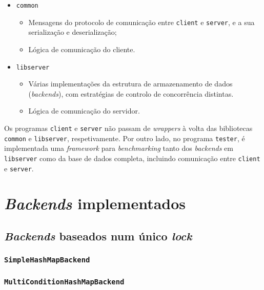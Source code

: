 \documentclass[12pt, a4paper, titlepage]{article}
\begin{document}
\begin{itemize}
    \item \texttt{common}
    \begin{itemize}
        \item Mensagens do protocolo de comunicação entre \texttt{client} e \texttt{server}, e a sua
            serialização e deserialização;

        \item Lógica de comunicação do cliente.
    \end{itemize}

    \item \texttt{libserver}
    \begin{itemize}
        \item Várias implementações da estrutura de armazenamento de dados (\emph{backends}), com
            estratégias de controlo de concorrência distintas.

        \item Lógica de comunicação do servidor.
    \end{itemize}
\end{itemize}

Os programas \texttt{client} e \texttt{server} não passam de \emph{wrappers} à volta das bibliotecas
\texttt{common} e \texttt{libserver}, respetivamente. Por outro lado, no programa \texttt{tester}, é
implementada uma \emph{framework} para \emph{benchmarking} tanto dos \emph{backends} em
\texttt{libserver} como da base de dados completa, incluindo comunicação entre \texttt{client} e
\texttt{server}.

\section{\emph{Backends} implementados}

\subsection{\emph{Backends} baseados num único \emph{lock}}

\subsubsection{\texttt{SimpleHashMapBackend}}

\subsubsection{\texttt{MultiConditionHashMapBackend}}
\end{document}
